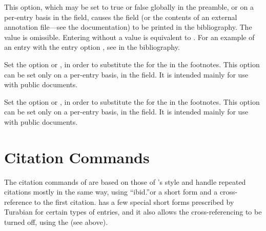 \documentclass{ltxdockit}[2010/02/12]
\begin{document}
\begin{optionlist}
\begin{valuelist}
\end{valuelist}


\label{printannotationsoption}
This option, which may be set to true or false globally in the preamble, or on a per-entry basis in the  field, causes the  field (or the contents of an external annotation file---see the  documentation) to be printed in the bibliography. The value  is omissible. Entering  without a value is equivalent to .
For an example of an entry with the entry option , see\citeauthor[][]{evans1996fraud-and-illusion} in the bibliography.



\label{useshortauthorssoption}
Set the option  or , in order to substitute the  for the  in the footnotes. This option can be set only on a per-entry basis, in the  field. It is intended mainly for use with public documents.


\label{useshorttitlesoption}
Set the option  or , in order to substitute the  for the  in the footnotes. This option can be set only on a per-entry basis, in the  field. It is intended mainly for use with public documents.


\end{optionlist}


\section{Citation Commands}\label{citecmds}
The citation commands of  are based on those of 's  style and handle repeated citations mostly in the same way, using ``ibid.''\midsentence or a short form and a cross-reference to the first citation.  has a few special short forms prescribed by Turabian for certain types of entries, and it also allows the cross-referencing to be turned off, using the  (see above). 
\end{document}
